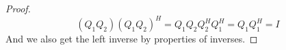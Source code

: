\documentclass[12pt]{article}
\newenvironment{problem}[2][Problem]{\begin{trivlist}
\item[\hskip \labelsep {\bfseries #1}\hskip \labelsep {\bfseries #2.}]}{\end{trivlist}}
\theoremstyle{definition}
\theoremstyle{definition}
\theoremstyle{definition}
\theoremstyle{definition}
\begin{document}
\begin{problem}{3.10}
\begin{itemize}
\begin{proof}
$$
(Q_1Q_2)(Q_1Q_2)^H = Q_1Q_2Q_2^HQ_1^H = Q_1Q_1^H = I
$$
And we also get the left inverse by properties of inverses.
\end{proof}
\end{itemize}
\end{problem}
\end{document}
